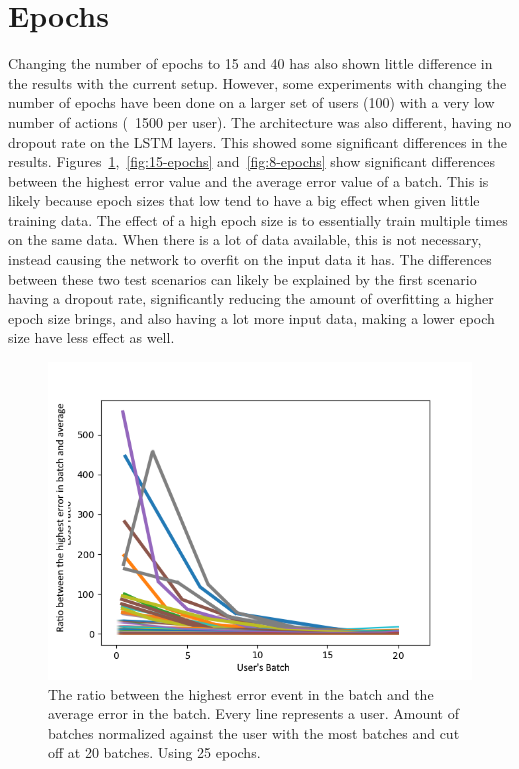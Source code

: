 \section{Epochs}
Changing the number of epochs to 15 and 40 has also shown little difference in the results with the current setup. However, some experiments with changing the number of epochs have been done on a larger set of users (100) with a very low number of actions (~1500 per user). The architecture was also different, having no dropout rate on the LSTM layers. This showed some significant differences in the results. Figures~\ref{fig:25-epochs},~\ref{fig:15-epochs} and~\ref{fig:8-epochs} show significant differences between the highest error value and the average error value of a batch. This is likely because epoch sizes that low tend to have a big effect when given little training data. The effect of a high epoch size is to essentially train multiple times on the same data. When there is a lot of data available, this is not necessary, instead causing the network to overfit on the input data it has. The differences between these two test scenarios can likely be explained by the first scenario having a dropout rate, significantly reducing the amount of overfitting a higher epoch size brings, and also having a lot more input data, making a lower epoch size have less effect as well.

\begin{figure}
	\begin{center}
		\includegraphics[scale=0.7]{experiments/epochs/25-epochs.png}
	\end{center}
	\caption{The ratio between the highest error event in the batch and the average error in the batch. Every line represents a user. Amount of batches normalized against the user with the most batches and cut off at 20 batches. Using 25 epochs.~\label{fig:25-epochs}}
\end{figure}


